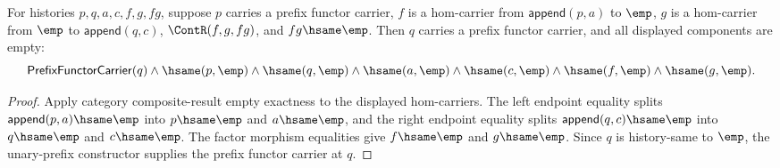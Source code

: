 \begin{theorem}
\label{thm:prefix-functor-carrier-comp-empty-middle-empty-result-readback}
For histories $p,q,a,c,f,g,fg$, suppose $p$ carries a prefix functor carrier,
$f$ is a hom-carrier from $\mathsf{append}(p,a)$ to $\emp$, $g$ is a
hom-carrier from $\emp$ to $\mathsf{append}(q,c)$, $\ContR(f,g,fg)$, and
$fg\hsame\emp$. Then $q$ carries a prefix functor carrier, and all displayed
components are empty:
$$
\mathsf{PrefixFunctorCarrier}(q)\wedge\hsame(p,\emp)\wedge\hsame(q,\emp)
\wedge\hsame(a,\emp)\wedge\hsame(c,\emp)\wedge
\hsame(f,\emp)\wedge\hsame(g,\emp).
$$
\end{theorem}
\begin{proof}
Apply category composite-result empty exactness to the displayed hom-carriers.
The left endpoint equality splits
$\mathsf{append}(p,a)\hsame\emp$ into $p\hsame\emp$ and $a\hsame\emp$, and the
right endpoint equality splits $\mathsf{append}(q,c)\hsame\emp$ into
$q\hsame\emp$ and $c\hsame\emp$. The factor morphism equalities give
$f\hsame\emp$ and $g\hsame\emp$. Since $q$ is history-same to $\emp$, the
unary-prefix constructor supplies the prefix functor carrier at $q$.
\end{proof}
